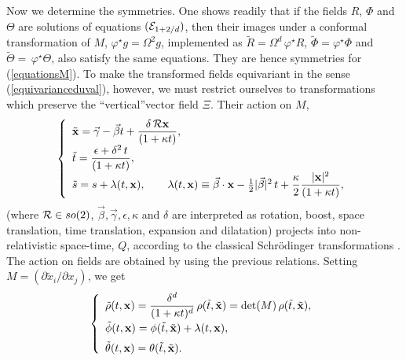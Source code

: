 \documentclass[11pt,a4paper]{article}
\begin{document}
Now we determine the symmetries. One shows readily  that
 if the fields $R$,
$\Phi$ and $\Theta$ are solutions of equations
$\displaystyle{({\cal E}_{1+2/d})}$,
then their images under a conformal
transformation of $M$, $\varphi^\star g=\Omega^2 g$, implemented as
$\tilde{R}=\Omega^d\,\varphi^\star R$,
$\tilde{\Phi}=\varphi^\star\Phi$ and
$\tilde{\Theta}=\,\varphi^\star\Theta$, also satisfy the same equations.
They are hence symmetries for (\ref{equationsM}).
To make the transformed
fields equivariant in the sense (\ref{equivarianceduval}),
however, we must restrict
ourselves to transformations
which preserve the ``vertical''vector field $\Xi$. Their action on
$M$,
\begin{eqnarray}
\left\lbrace
\begin{array}{l}
\tilde{{\bf x}}={\vec\gamma}-{\vec\beta}t+
\displaystyle{\frac{\delta\,{\cal
R}{\bf x}}{(1+\kappa t)}},
\\[2mm]
\tilde{t}=\displaystyle{\frac{\epsilon+\delta^2\,t}{(1+\kappa t)}},
\\[2mm]
\tilde{s}=s+\lambda(t,{\bf x}),
\qquad
\lambda(t,{\bf x})\equiv
{\vec\beta}\cdot{\bf x}-\frac{1}{2}\vert{\vec\beta}\vert^2\,t
+\displaystyle{\frac{\kappa}{2}
\frac{\vert{\bf x}\vert^2}{(1+\kappa t)}},
\label{transfM}
\end{array}
\right.
\end{eqnarray}
(where ${\cal R}\in so(2)$, ${\vec\beta},
{\vec\gamma}, \epsilon, \kappa$ and
$\delta$ are interpreted as rotation, boost, space
translation, time translation, expansion and dilatation)
projects into non-relativistic space-time, $Q$, according to the classical
Schr\"{o}dinger transformations
\cite{NH, DGH}. The action on fields are
obtained by using the previous relations. Setting
$M=\displaystyle{\left(\partial \tilde{x}_i/\partial x_j\right)}$, we
get
\begin{eqnarray}
\begin{array}{l}
\left\lbrace
\begin{array}{l}
\tilde{\rho}(t,{\bf x})=\displaystyle{\frac{\delta^d}{(1+\kappa
t)^d}}\,\rho(\tilde{t},\tilde{{\bf
x}})=\hbox{det}(M)\,\rho(\tilde{t},\tilde{{\bf x}}),
\\[2.8mm]
\tilde{\phi}(t,{\bf x})=\phi(\tilde{t},\tilde{{\bf x}})
+\lambda(t,{\bf x}),
\\[2mm]
\tilde{\theta}(t,{\bf x})=
\theta(\tilde{t},\tilde{{\bf x}}).
\end{array}
\right.
\end{array}
\label{dilatation}
\end{eqnarray}
\goodbreak
\end{document}
